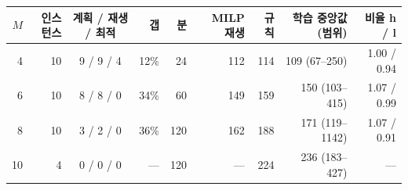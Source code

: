 \begin{tabular}{rrcrrrrrr}
\toprule
$M$ & 인스턴스 & 계획 / 재생 / 최적 & 갭 & 분 & MILP 재생 & 규칙 & 학습 중앙값 (범위) & 비율 h / l \\
\midrule
4 & 10 & 9 / 9 / 4 & 12\% & 24 & 112 & 114 & 109 (67--250) & 1.00 / 0.94 \\
6 & 10 & 8 / 8 / 0 & 34\% & 60 & 149 & 159 & 150 (103--415) & 1.07 / 0.99 \\
8 & 10 & 3 / 2 / 0 & 36\% & 120 & 162 & 188 & 171 (119--1142) & 1.07 / 0.91 \\
10 & 4 & 0 / 0 / 0 & --- & 120 & --- & 224 & 236 (183--427) & --- \\
\bottomrule
\end{tabular}%

